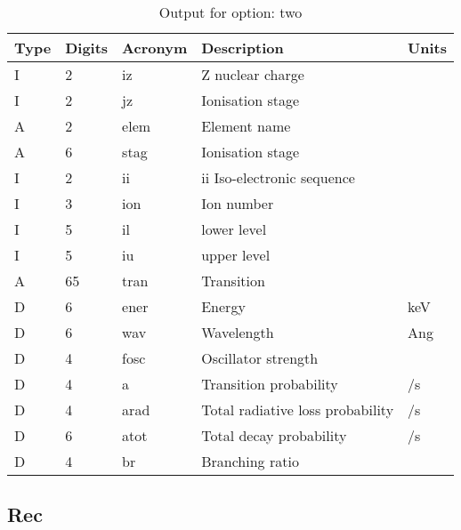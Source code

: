 \begin{table}[!p]
\caption{Output for option: two}
\label{tabout:two}
\begin{tabular}{lllll}
\hline
Type & Digits & Acronym & Description & Units \\ 
\hline
I &  2 & iz   & Z nuclear charge                 &                  \\
I &  2 & jz   & Ionisation stage                 &                  \\
A &  2 & elem & Element name                     &                  \\
A &  6 & stag & Ionisation stage                 &                  \\
I &  2 & ii   & ii Iso-electronic sequence       &                  \\
I &  3 & ion  & Ion number                       &                  \\
I &  5 & il   & lower level                      &                  \\
I &  5 & iu   & upper level                      &                  \\
A & 65 & tran & Transition                       &                  \\
D &  6 & ener & Energy                           & keV              \\
D &  6 & wav  & Wavelength                       & Ang              \\
D &  4 & fosc & Oscillator strength              &                  \\
D &  4 & a    & Transition probability           & /s               \\
D &  4 & arad & Total radiative loss probability & /s               \\
D &  6 & atot & Total decay probability          & /s               \\
D &  4 & br   & Branching ratio                  &                  \\
\hline
\end{tabular}
\end{table}

\subsection{Rec}

